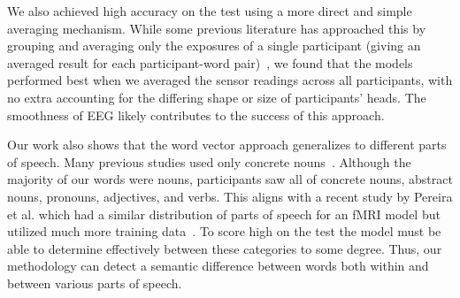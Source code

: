 We also achieved high accuracy on the \tvt test using a more direct and simple averaging mechanism. While some previous literature has approached this by grouping and averaging only the exposures of a single participant (giving an averaged result for each participant-word pair)~\cite{Mitchell2008,Sudre2012}, we found that the models performed best when we averaged the sensor readings across all participants, with no extra accounting for the differing shape or size of participants' heads. The smoothness of EEG likely contributes to the success of this approach.

Our work also shows that the word vector approach generalizes to different parts of speech. Many previous studies used only concrete nouns~\cite{Mitchell2008,Sudre2012,Murphy2009}. Although the majority of our words were nouns, participants saw all of concrete nouns, abstract nouns, pronouns, adjectives, and verbs. This aligns with a recent study by Pereira et al. which had a similar distribution of parts of speech for an fMRI model but utilized much more training data~\cite{pereira2018toward}. To score high on the \tvt test the model must be able to determine effectively between these categories to some degree. Thus, our methodology can detect a semantic difference between words both within and between various parts of speech.
